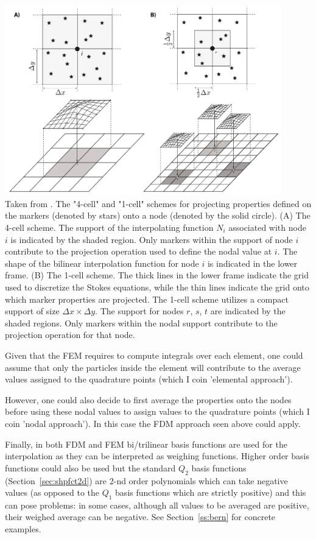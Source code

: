 \begin{center}
\includegraphics[width=12cm]{images/dumg11}\\
{\captionfont Taken from \cite{dumg11}. The "4-cell" and "1-cell" schemes for projecting 
properties defined on the markers (denoted by stars) onto a node (denoted by the solid circle). 
(A) The 4-cell scheme. The support of the interpolating function $N_i$ associated
with node $i$ is indicated by the shaded region. Only markers within the support of node $i$ 
contribute to the projection operation used to define the nodal value at $i$. The shape of 
the bilinear interpolation function for node $i$ is indicated in the lower frame. 
(B) The 1-cell scheme. The thick lines in the lower frame indicate the grid used to discretize the
Stokes equations, while the thin lines indicate the grid onto which marker properties are projected. 
The 1-cell scheme utilizes a compact support of size $\Delta x \times  \Delta y$. The support 
for nodes $r$, $s$, $t$ are indicated by the shaded regions. Only markers within the nodal 
support contribute to the projection operation for that node.}
\end{center}

Given that the FEM requires to compute integrals over each element, one could assume that 
only the particles inside the element will contribute 
to the average values assigned to the quadrature points (which I coin 'elemental approach'). 

However, one could also decide to first average the properties onto the nodes
before using these nodal values to assign values to the quadrature points (which I coin 'nodal approach'). 
In this case the FDM approach seen above could apply. 

Finally, in both FDM and FEM bi/trilinear basis functions are used for the interpolation as 
they can be interpreted as weighing functions. Higher order basis functions could also be used 
but the standard $Q_2$ basis functions (Section~\ref{sec:shpfct2d})
are 2-nd order polynomials which can take negative values (as opposed to the $Q_1$ 
basis functions which are strictly positive)
and this can pose problems: in some cases, although all values to be averaged are positive, 
their weighed average can be negative.
See Section~\ref{ss:bern} for concrete examples.


